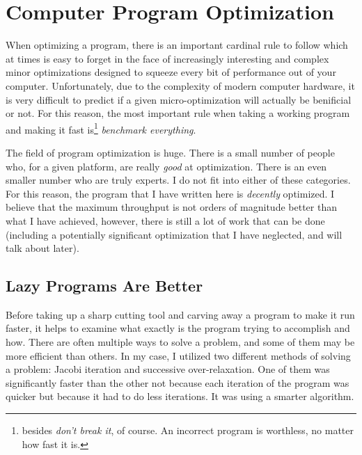 \section{Computer Program Optimization} \label{app:opt}

When optimizing a program, there is an important cardinal rule to follow which at times
is easy to forget in the face of increasingly interesting and complex minor optimizations
designed to squeeze every bit of performance out of your computer. Unfortunately, due
to the complexity of modern computer hardware, it is
very difficult to predict if a given micro-optimization will actually be benificial or
not. For this reason, the most important rule when taking a working program and making it
fast is\footnote{besides \textit{don't break it}, of course. An incorrect program is worthless, no matter
how fast it is.} \textit{benchmark everything}.

The field of program optimization is huge. There is a small number of people who, for
a given platform, are really \textit{good} at optimization. There is an even smaller number
who are truly experts. I do not fit into either of these categories. For this reason, the program
that I have written here is \textit{decently} optimized. I believe that the maximum throughput
is not orders of magnitude better than what I have achieved, however, there is still a lot of work
that can be done (including a potentially significant optimization that I have neglected, and will talk
about later).


\subsection{Lazy Programs Are Better}

Before taking up a sharp cutting tool and carving away a program to make it run faster, it helps to examine
what exactly is the program trying to accomplish and how. There are often multiple ways to solve a problem,
and some of them may be more efficient than others. In my case, I utilized two different methods of solving
a problem: Jacobi iteration and successive over-relaxation. One of them was significantly faster than the other
not because each iteration of the program was quicker but because it had to do less iterations. It was using a
smarter algorithm.

